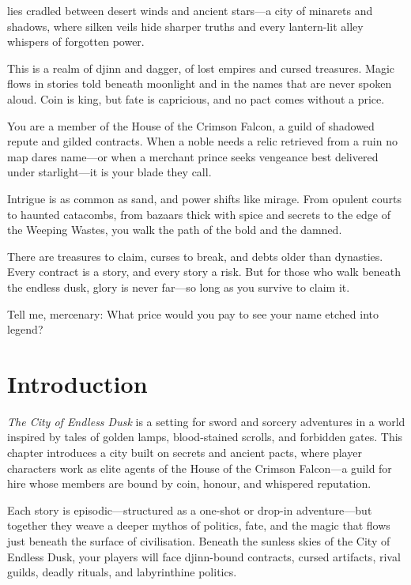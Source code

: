 

\begin{WyrdSettingHeading}
     lies cradled between desert winds and ancient stars—a city of minarets and shadows, where silken veils hide sharper truths and every lantern-lit alley whispers of forgotten power.

    This is a realm of djinn and dagger, of lost empires and cursed treasures. Magic flows in stories told beneath moonlight and in the names that are never spoken aloud. Coin is king, but fate is capricious, and no pact comes without a price.

    You are a member of the House of the Crimson Falcon, a guild of shadowed repute and gilded contracts. When a noble needs a relic retrieved from a ruin no map dares name—or when a merchant prince seeks vengeance best delivered under starlight—it is your blade they call.

    Intrigue is as common as sand, and power shifts like mirage. From opulent courts to haunted catacombs, from bazaars thick with spice and secrets to the edge of the Weeping Wastes, you walk the path of the bold and the damned.

    There are treasures to claim, curses to break, and debts older than dynasties. Every contract is a story, and every story a risk. But for those who walk beneath the endless dusk, glory is never far—so long as you survive to claim it.

    Tell me, mercenary: What price would you pay to see your name etched into legend?
\end{WyrdSettingHeading}

\section{Introduction}

\textit{The City of Endless Dusk} is a setting for sword and sorcery adventures in a world inspired by tales of golden lamps, blood-stained scrolls, and forbidden gates. This chapter introduces a city built on secrets and ancient pacts, where player characters work as elite agents of the House of the Crimson Falcon—a guild for hire whose members are bound by coin, honour, and whispered reputation.

Each story is episodic—structured as a one-shot or drop-in adventure—but together they weave a deeper mythos of politics, fate, and the magic that flows just beneath the surface of civilisation. Beneath the sunless skies of the City of Endless Dusk, your players will face djinn-bound contracts, cursed artifacts, rival guilds, deadly rituals, and labyrinthine politics.


